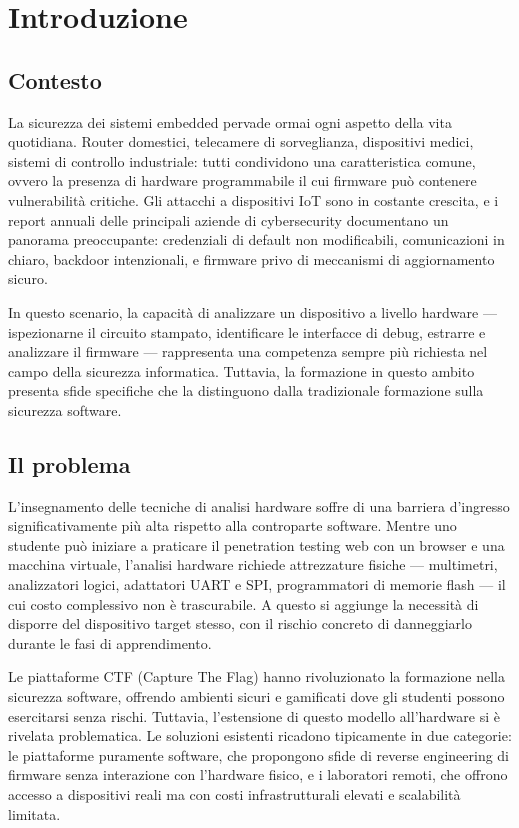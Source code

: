 \chapter*{Introduzione}

\section*{Contesto}

La sicurezza dei sistemi embedded pervade ormai ogni aspetto della vita quotidiana. Router domestici, telecamere di sorveglianza, dispositivi medici, sistemi di controllo industriale: tutti condividono una caratteristica comune, ovvero la presenza di hardware programmabile il cui firmware può contenere vulnerabilità critiche. Gli attacchi a dispositivi IoT sono in costante crescita, e i report annuali delle principali aziende di cybersecurity documentano un panorama preoccupante: credenziali di default non modificabili, comunicazioni in chiaro, backdoor intenzionali, e firmware privo di meccanismi di aggiornamento sicuro.

In questo scenario, la capacità di analizzare un dispositivo a livello hardware --- ispezionarne il circuito stampato, identificare le interfacce di debug, estrarre e analizzare il firmware --- rappresenta una competenza sempre più richiesta nel campo della sicurezza informatica. Tuttavia, la formazione in questo ambito presenta sfide specifiche che la distinguono dalla tradizionale formazione sulla sicurezza software.

\section*{Il problema}

L'insegnamento delle tecniche di analisi hardware soffre di una barriera d'ingresso significativamente più alta rispetto alla controparte software. Mentre uno studente può iniziare a praticare il penetration testing web con un browser e una macchina virtuale, l'analisi hardware richiede attrezzature fisiche --- multimetri, analizzatori logici, adattatori UART e SPI, programmatori di memorie flash --- il cui costo complessivo non è trascurabile. A questo si aggiunge la necessità di disporre del dispositivo target stesso, con il rischio concreto di danneggiarlo durante le fasi di apprendimento.

Le piattaforme CTF (Capture The Flag) hanno rivoluzionato la formazione nella sicurezza software, offrendo ambienti sicuri e gamificati dove gli studenti possono esercitarsi senza rischi. Tuttavia, l'estensione di questo modello all'hardware si è rivelata problematica. Le soluzioni esistenti ricadono tipicamente in due categorie: le piattaforme puramente software, che propongono sfide di reverse engineering di firmware senza interazione con l'hardware fisico, e i laboratori remoti, che offrono accesso a dispositivi reali ma con costi infrastrutturali elevati e scalabilità limitata.


